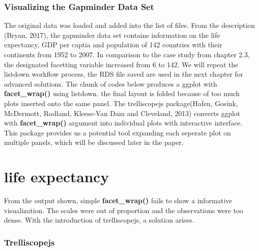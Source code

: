 \documentclass[
]{article}
\begin{document}
\hypertarget{visualizing-the-gapminder-data-set}{%
\subsubsection{Visualizing the Gapminder Data
Set}\label{visualizing-the-gapminder-data-set}}

The original data was loaded and added into the list of files. From the
description (Bryan, 2017), the gapminder data set contains information
on the life expectancy, GDP per captia and population of 142 countries
with their continents from 1952 to 2007. In comparison to the case study
from chapter 2.3, the designated facetting variable increased from 6 to
142. We will repeat the listdown workflow process, the RDS file saved
are used in the next chapter for advanced solutions. The chunk of codes
below produces a ggplot with \textbf{facet\_wrap()} using listdown. the
final layout is folded because of too much plots inserted onto the same
panel. The trelliscopejs package(Hafen, Gosink, McDermott, Rodland,
Kleese-Van Dam and Cleveland, 2013) converts ggplot with
\textbf{facet\_wrap()} argument into individual plots with interactive
interface. This package provides us a potential tool expanding each
seperate plot on multiple panels, which will be discussed later in the
paper.

\hypertarget{life-expectancy}{%
\section{life expectancy}\label{life-expectancy}}

From the output shown, simple \textbf{facet\_wrap()} fails to show a
informative visualization. The scales were out of proportion and the
observations were too dense. With the introduction of trelliscopejs, a
solution arises.

\hypertarget{trelliscopejs}{%
\subsubsection{Trelliscopejs}\label{trelliscopejs}}
\end{document}
